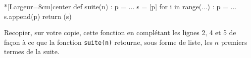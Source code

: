 \begin{enumerate}
\begin{CodePythonLstAlt}*[Largeur=8cm]{center}
def suite(n) :
	p = ...
	s = [p]
	for i in range(...) :
		p = ...
		s.append(p)
	return (s)
\end{CodePythonLstAlt}
	Recopier, sur votre copie, cette fonction en complétant les lignes 2, 4 et 5 de façon à ce que la fonction \texttt{suite(n)} retourne, sous forme de liste, les $n$ premiers termes de la suite.
\end{enumerate}